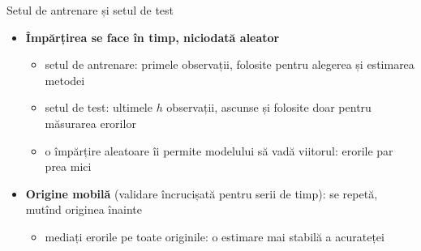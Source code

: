 \begin{frame}{Setul de antrenare și setul de test}
\itemsize{\footnotesize}
\centering
{}
\begin{itemize}
    \item \textbf{Împărțirea se face în timp, niciodată aleator}
    \begin{itemize}
        \item setul de antrenare: primele observații, folosite pentru alegerea și estimarea metodei
        \item setul de test: ultimele $h$ observații, ascunse și folosite doar pentru măsurarea erorilor
        \item o împărțire aleatoare îi permite modelului să vadă viitorul: erorile par prea mici
    \end{itemize}
    \item \textbf{Origine mobilă} (validare încrucișată pentru serii de timp): se repetă, mutînd originea înainte
    \begin{itemize}
        \item mediați erorile pe toate originile: o estimare mai stabilă a acurateței
    \end{itemize}
\end{itemize}
\end{frame}

